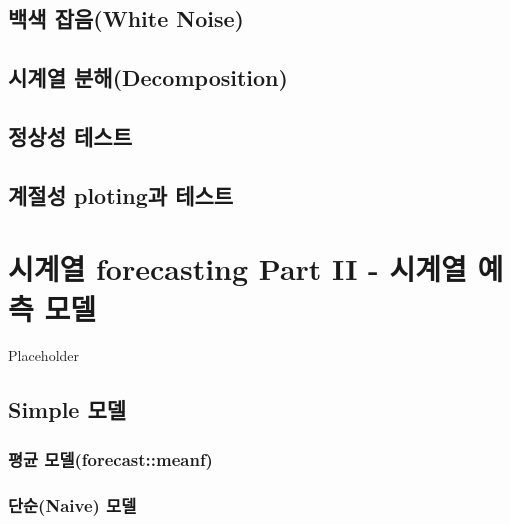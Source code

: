 \documentclass[
]{book}
\begin{document}
\hypertarget{uxbc31uxc0c9-uxc7a1uxc74cwhite-noise}{%
\section{백색 잡음(White Noise)}\label{uxbc31uxc0c9-uxc7a1uxc74cwhite-noise}}

\hypertarget{uxc2dcuxacc4uxc5f4-uxbd84uxd574decomposition}{%
\section{시계열 분해(Decomposition)}\label{uxc2dcuxacc4uxc5f4-uxbd84uxd574decomposition}}

\hypertarget{uxc815uxc0c1uxc131-uxd14cuxc2a4uxd2b8}{%
\section{정상성 테스트}\label{uxc815uxc0c1uxc131-uxd14cuxc2a4uxd2b8}}

\hypertarget{uxacc4uxc808uxc131-plotinguxacfc-uxd14cuxc2a4uxd2b8}{%
\section{계절성 ploting과 테스트}\label{uxacc4uxc808uxc131-plotinguxacfc-uxd14cuxc2a4uxd2b8}}

\hypertarget{uxc2dcuxacc4uxc5f4-forecasting-part-ii---uxc2dcuxacc4uxc5f4-uxc608uxce21-uxbaa8uxb378}{%
\chapter{시계열 forecasting Part II - 시계열 예측 모델}\label{uxc2dcuxacc4uxc5f4-forecasting-part-ii---uxc2dcuxacc4uxc5f4-uxc608uxce21-uxbaa8uxb378}}

Placeholder

\hypertarget{simple-uxbaa8uxb378}{%
\section{Simple 모델}\label{simple-uxbaa8uxb378}}

\hypertarget{uxd3c9uxade0-uxbaa8uxb378forecastmeanf}{%
\subsection{평균 모델(forecast::meanf)}\label{uxd3c9uxade0-uxbaa8uxb378forecastmeanf}}

\hypertarget{uxb2e8uxc21cnaive-uxbaa8uxb378}{%
\subsection{단순(Naive) 모델}\label{uxb2e8uxc21cnaive-uxbaa8uxb378}}
\end{document}
